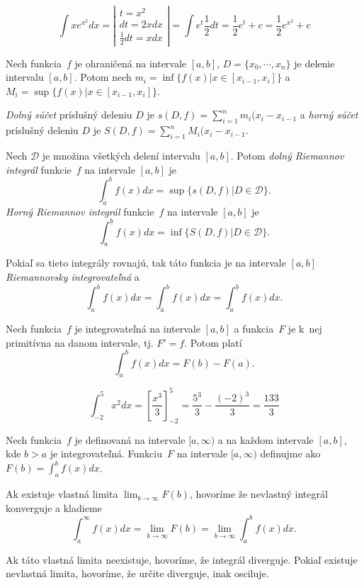 \begin{example}
	\[
		\int x e^{x^2} dx = 
		\left|{\begin{array}{c}
		  t = x^2 \\
		  dt = 2x dx \\
		  \frac{1}{2} dt = x dx
		  \end{array} } \right|
		  = \int e^t \frac{1}{2} dt = \frac{1}{2} e^t + c = \frac{1}{2} e^{x^2} + c
	\]
\end{example}

\begin{definition}
	Nech funkcia~$f$ je ohraničená na intervale $[a,b]$, $D=\{x_0, \cdots, x_n \}$
	je delenie intervalu $[a,b]$. Potom nech $m_i=\inf{\{ f(x) | x \in [x_{i-1},x_i] \}}$
	a $M_i=\sup{\{ f(x) | x \in [x_{i-1},x_i] \}}$.
	
	{\em Dolný súčet} príslušný deleniu $D$ je $s(D,f)=\sum_{i=1}^n m_i(x_i-x_{i-1}$
	a {\em horný súčet} príslušný deleniu $D$ je $S(D,f)=\sum_{i=1}^n M_i(x_i-x_{i-1}$.
	
	Nech $\mathcal{D}$ je množina všetkých delení intervalu $[a,b]$. Potom
	{\em dolný Riemannov integrál} funkcie~$f$ na intervale $[a,b]$ je
	\[
		\int_{\overline{a}}^b f(x) dx = \sup \{ s(D,f) | D \in \mathcal{D} \}.
	\]
	{\em Horný Riemannov integrál} funkcie~$f$ na intervale $[a,b]$ je
	\[
		\int_a^{\underline{b}} f(x) dx = \inf \{ S(D,f) | D \in \mathcal{D} \}.
	\]
	
	Pokiaľ sa tieto integrály rovnajú, tak táto funkcia je na intervale $[a,b]$
	{\em Riemannovsky integrovateľná} a 
	\[
		\int_a^b f(x) dx = \int_{\overline{a}}^b f(x) dx = \int_a^{\underline{b}} f(x) dx.
	\]
\end{definition}

\begin{theorem}
	Nech funkcia~$f$ je integrovateľná na intervale $[a,b]$ a funkcia~$F$
	je k~nej primitívna na danom intervale, tj. $F'=f$. Potom platí
	\[
		\int_a^b f(x) dx = F(b) - F(a).
	\]
\end{theorem}

\begin{example}
	\[
		\int_{-2}^5 x^2 dx = \left[ \frac{x^3}{3} \right]_{-2}^5 = \frac{5^3}{3} - \frac{(-2)^3}{3} = \frac{133}{3}
	\]
\end{example}

\begin{definition}
	Nech funkcia~$f$ je definovaná na intervale $[a,\infty)$ a na
	každom intervale $[a,b]$, kde $b > a$ je integrovateľná. 
	Funkciu~$F$ na intervale $[a, \infty)$ definujme ako 
	$F(b) = \int_a^b f(x) dx$. 
	
	Ak existuje vlastná limita $\lim_{b \to \infty} F(b)$, hovoríme
	že nevlastný integrál konverguje a kladieme
	\[
		\int_a^{\infty} f(x) dx = \lim_{b \to \infty} F(b) = \lim_{b \to \infty} \int_a^b f(x) dx.
	\]
	
	Ak táto vlastná limita neexistuje, hovoríme, že integrál diverguje.
	Pokiaľ existuje nevlastná limita, hovoríme, že určite diverguje,
	inak osciluje.
\end{definition}

